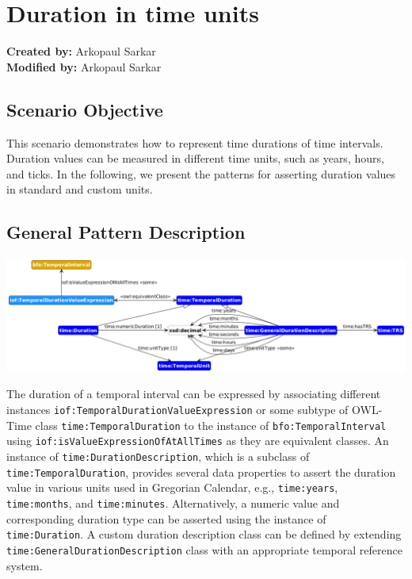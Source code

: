 \section{Duration in time units}
\label{sec-change-location}

\textbf{Created by:} Arkopaul Sarkar \\
\textbf{Modified by:} Arkopaul Sarkar \\

\subsection*{Scenario Objective}

This scenario demonstrates how to represent time durations of time intervals. Duration values can be measured in different time units, such as years, hours, and ticks. In the following, we present the patterns for asserting duration values in standard and custom units.   

\subsection*{General Pattern Description}

\includegraphics[scale=0.36]{scenarios/time-duration/image/time-duration.png}

The duration of a temporal interval can be expressed by associating different instances \texttt{iof:TemporalDurationValueExpression} or some subtype of OWL-Time class \texttt{time:TemporalDuration} to the instance of \texttt{bfo:TemporalInterval} using \texttt{iof:isValueExpressionOfAtAllTimes} as they are equivalent classes. An instance of \texttt{time:DurationDescription}, which is a subclass of \texttt{time:TemporalDuration}, provides several data properties to assert the duration value in various units used in Gregorian Calendar, e.g., \texttt{time:years}, \texttt{time:months}, and \texttt{time:minutes}. Alternatively, a numeric value and corresponding duration type can be asserted using the instance of \texttt{time:Duration}. A custom duration description class can be defined by extending \texttt{time:GeneralDurationDescription} class with an appropriate temporal reference system. 


